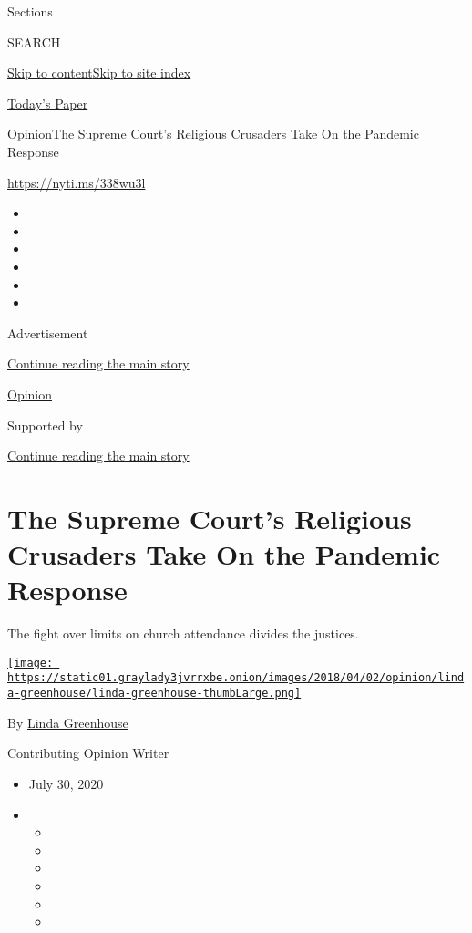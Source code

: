 Sections

SEARCH

\protect\hyperlink{site-content}{Skip to
content}\protect\hyperlink{site-index}{Skip to site index}

\href{https://myaccount.nytimes3xbfgragh.onion/auth/login?response_type=cookie\&client_id=vi}{}

\href{https://www.nytimes3xbfgragh.onion/section/todayspaper}{Today's
Paper}

\href{/section/opinion}{Opinion}\textbar{}The Supreme Court's Religious
Crusaders Take On the Pandemic Response

\url{https://nyti.ms/338wu3l}

\begin{itemize}
\item
\item
\item
\item
\item
\item
\end{itemize}

Advertisement

\protect\hyperlink{after-top}{Continue reading the main story}

\href{/section/opinion}{Opinion}

Supported by

\protect\hyperlink{after-sponsor}{Continue reading the main story}

\hypertarget{the-supreme-courts-religious-crusaders-take-on-the-pandemic-response}{%
\section{The Supreme Court's Religious Crusaders Take On the Pandemic
Response}\label{the-supreme-courts-religious-crusaders-take-on-the-pandemic-response}}

The fight over limits on church attendance divides the justices.

\href{https://www.nytimes3xbfgragh.onion/by/linda-greenhouse}{\texttt{[image: https://static01.graylady3jvrrxbe.onion/images/2018/04/02/opinion/linda-greenhouse/linda-greenhouse-thumbLarge.png]}}

By \href{https://www.nytimes3xbfgragh.onion/by/linda-greenhouse}{Linda
Greenhouse}

Contributing Opinion Writer

\begin{itemize}
\item
  July 30, 2020
\item
  \begin{itemize}
  \item
  \item
  \item
  \item
  \item
  \item
  \end{itemize}
\end{itemize}

